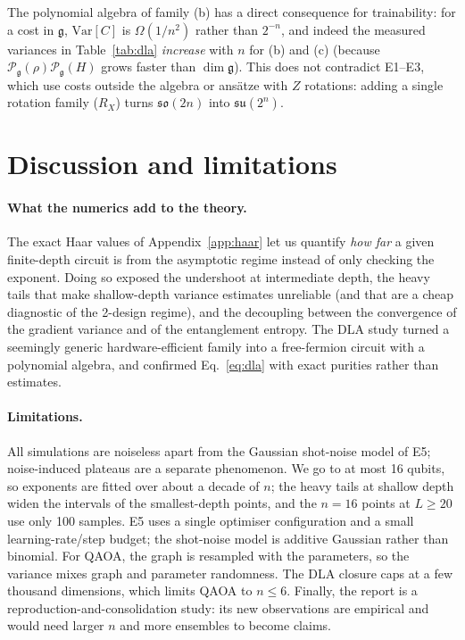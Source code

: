 \documentclass[11pt]{article}
\newcommand{\Var}{\mathrm{Var}}
\newcommand{\g}{\mathfrak{g}}
\begin{document}
The polynomial algebra of family (b) has a direct consequence for trainability: for a cost in $\g$, $\Var[C]$ is $\Omega(1/n^2)$ rather than $2^{-n}$, and indeed the measured variances in Table~\ref{tab:dla} \emph{increase} with $n$ for (b) and (c) (because $\mathcal P_\g(\rho)\mathcal P_\g(H)$ grows faster than $\dim\g$). This does not contradict E1--E3, which use costs outside the algebra or ans\"atze with $Z$ rotations: adding a single rotation family ($R_X$) turns $\mathfrak{so}(2n)$ into $\mathfrak{su}(2^n)$.

\section{Discussion and limitations}
\label{sec:discussion}

\paragraph{What the numerics add to the theory.}
The exact Haar values of Appendix~\ref{app:haar} let us quantify \emph{how far} a given finite-depth circuit is from the asymptotic regime instead of only checking the exponent. Doing so exposed the undershoot at intermediate depth, the heavy tails that make shallow-depth variance estimates unreliable (and that are a cheap diagnostic of the 2-design regime), and the decoupling between the convergence of the gradient variance and of the entanglement entropy. The DLA study turned a seemingly generic hardware-efficient family into a free-fermion circuit with a polynomial algebra, and confirmed Eq.~\eqref{eq:dla} with exact purities rather than estimates.

\paragraph{Limitations.}
All simulations are noiseless apart from the Gaussian shot-noise model of E5; noise-induced plateaus are a separate phenomenon. We go to at most 16 qubits, so exponents are fitted over about a decade of $n$; the heavy tails at shallow depth widen the intervals of the smallest-depth points, and the $n=16$ points at $L\ge20$ use only 100 samples. E5 uses a single optimiser configuration and a small learning-rate/step budget; the shot-noise model is additive Gaussian rather than binomial. For QAOA, the graph is resampled with the parameters, so the variance mixes graph and parameter randomness. The DLA closure caps at a few thousand dimensions, which limits QAOA to $n\le6$. Finally, the report is a reproduction-and-consolidation study: its new observations are empirical and would need larger $n$ and more ensembles to become claims.
\end{document}
